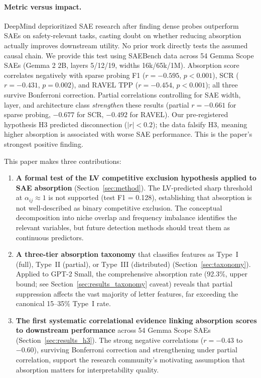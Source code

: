 \documentclass{article}
\begin{document}
\paragraph{Metric versus impact.} DeepMind deprioritized SAE research after finding dense probes outperform SAEs on safety-relevant tasks, casting doubt on whether reducing absorption actually improves downstream utility. No prior work directly tests the assumed causal chain. We provide this test using SAEBench \citep{karvonen2025saebench} data across 54 Gemma Scope SAEs (Gemma 2 2B, layers 5/12/19, widths 16k/65k/1M). Absorption score correlates negatively with sparse probing F1 ($r = -0.595$, $p < 0.001$), SCR ($r = -0.431$, $p = 0.002$), and RAVEL TPP ($r = -0.454$, $p < 0.001$); all three survive Bonferroni correction. Partial correlations controlling for SAE width, layer, and architecture class \emph{strengthen} these results (partial $r = -0.661$ for sparse probing, $-0.677$ for SCR, $-0.492$ for RAVEL). Our pre-registered hypothesis H3 predicted disconnection ($|r| < 0.2$); the data falsify H3, meaning higher absorption is associated with worse SAE performance. This is the paper's strongest positive finding.

This paper makes three contributions:

\begin{enumerate}
  \item \textbf{A formal test of the LV competitive exclusion hypothesis applied to SAE absorption} (Section~\ref{sec:method}). The LV-predicted sharp threshold at $\alpha_{ij} \approx 1$ is not supported (test F1 = 0.128), establishing that absorption is not well-described as binary competitive exclusion. The conceptual decomposition into niche overlap and frequency imbalance identifies the relevant variables, but future detection methods should treat them as continuous predictors.

  \item \textbf{A three-tier absorption taxonomy} that classifies features as Type~I (full), Type~II (partial), or Type~III (distributed) (Section~\ref{sec:taxonomy}). Applied to GPT-2 Small, the comprehensive absorption rate (92.3\%, upper bound; see Section~\ref{sec:results_taxonomy} caveat) reveals that partial suppression affects the vast majority of letter features, far exceeding the canonical 15--35\% Type~I rate.

  \item \textbf{The first systematic correlational evidence linking absorption scores to downstream performance} across 54 Gemma Scope SAEs (Section~\ref{sec:results_h3}). The strong negative correlations ($r = -0.43$ to $-0.60$), surviving Bonferroni correction and strengthening under partial correlation, support the research community's motivating assumption that absorption matters for interpretability quality.
\end{enumerate}
\end{document}
